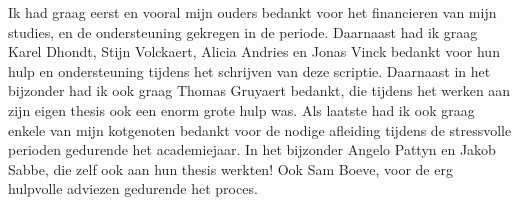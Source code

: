 Ik had graag eerst en vooral mijn ouders bedankt voor het financieren van mijn
studies, en de ondersteuning gekregen in de periode. Daarnaast had ik graag
Karel Dhondt, Stijn Volckaert, Alicia Andries en Jonas Vinck bedankt voor hun
hulp en ondersteuning tijdens het schrijven van deze scriptie. Daarnaast in het
bijzonder had ik ook graag Thomas Gruyaert bedankt, die tijdens het werken aan
zijn eigen thesis ook een enorm grote hulp was. Als laatste had ik ook graag
enkele van mijn kotgenoten bedankt voor de nodige afleiding tijdens de
stressvolle perioden gedurende het academiejaar. In het bijzonder Angelo Pattyn
en Jakob Sabbe, die zelf ook aan hun thesis werkten! Ook Sam Boeve, voor de erg
hulpvolle adviezen gedurende het proces.